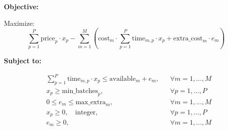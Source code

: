 \documentclass{article}
\begin{document}
\textbf{Objective:}

Maximize:
\[
\sum_{p=1}^P \text{price}_p \cdot x_p - \sum_{m=1}^M \left( \text{cost}_m \cdot \sum_{p=1}^P \text{time}_{m,p} \cdot x_p + \text{extra\_cost}_m \cdot e_m \right)
\]

\textbf{Subject to:}

\begin{align*}
& \sum_{p=1}^P \text{time}_{m,p} \cdot x_p \leq \text{available}_m + e_m, && \forall m = 1, \ldots, M \\
& x_p \geq \text{min\_batches}_p, && \forall p = 1, \ldots, P \\
& 0 \leq e_m \leq \text{max\_extra}_m, && \forall m = 1, \ldots, M \\
& x_p \geq 0, \quad \text{integer}, && \forall p = 1, \ldots, P \\
& e_m \geq 0, && \forall m = 1, \ldots, M
\end{align*}
\end{document}
